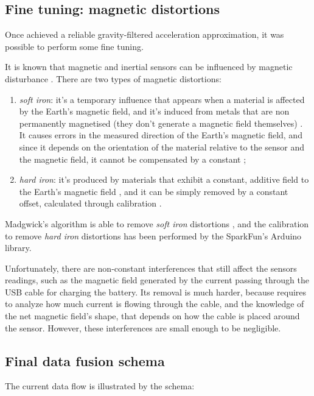 \subsection{Fine tuning: magnetic distortions}
Once achieved a reliable gravity-filtered acceleration approximation, it was possible to perform some fine tuning.
\bigbreak

It is known that magnetic and inertial sensors can be influenced by magnetic disturbance \cite{Fan17}.
There are two types of magnetic distortions:
\begin{enumerate}
	\item \textit{soft iron}: it's a temporary influence that appears when a material is affected by the Earth's magnetic field, and it's induced from metals that are non permanently magnetised (they don't generate a magnetic field themselves) \cite{Cro15}. It causes errors in the measured direction of the Earth's magnetic field, and since it depends on the orientation of the material relative to the sensor and the magnetic field, it cannot be compensated by a constant \cite{CompensatingIron};
	\item \textit{hard iron}: it's produced by materials that exhibit a constant, additive field to the Earth's magnetic field \cite{CompensatingIron}, and it can be simply removed by a constant offset, calculated through calibration \cite{CompensatingIron, Geb06, Kok12}.
\end{enumerate}

Madgwick's algorithm is able to remove \textit{soft iron} distortions \cite[11-12]{Mad10}, and the calibration to remove \textit{hard iron} distortions has been performed by the SparkFun's Arduino library.
\bigbreak

Unfortunately, there are non-constant interferences that still affect the sensors readings, such as the magnetic field generated by the current passing through the USB cable for charging the battery.
Its removal is much harder, because requires to analyze how much current is flowing through the cable, and the knowledge of the net magnetic field's shape, that depends on how the cable is placed around the sensor. However, these interferences are small enough to be negligible.

\subsection{Final data fusion schema}
The current data flow is illustrated by the schema:

\begin{center}
	\begin{figure}[ht!]
	\end{figure}
\end{center}

